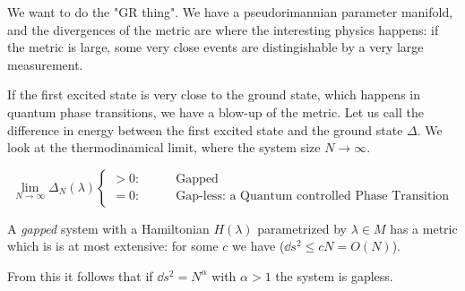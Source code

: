 \documentclass[main.tex]{subfiles}
\begin{document}
We want to do the "GR thing". We have a pseudorimannian parameter manifold, and the divergences of the metric are where the interesting physics happens: if the metric is large, some very close events are distingishable by a very large measurement.

If the first excited state is very close to the ground state, which happens in quantum phase transitions, we have a blow-up of the metric. Let us call the difference in energy between the first excited state and the ground state \(\Delta\).
We look at the thermodinamical limit, where the system size \(N \rightarrow \infty\).

\begin{equation}
   \lim _ {N \rightarrow \infty} \Delta_N(\lambda) \begin{cases}
     > 0\colon \qquad &\text{Gapped}  \\
     =0 \colon \qquad &\text{Gap-less: a Quantum controlled Phase Transition}
 \end{cases}
\end{equation}

\begin{claim}
    A \emph{gapped} system with a Hamiltonian \(H(\lambda)\) parametrized by  \(\lambda \in M \) has a metric which is is at most extensive: for some \(c\) we have (\(\dd{s^2} \leq cN = O(N) \)).
\end{claim}

From this it follows that if \(\dd{s^2} = N^\alpha \) with \(\alpha>1\) the system is gapless.
\end{document}
